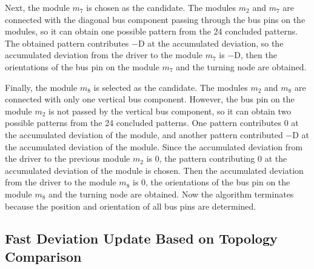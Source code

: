 Next, the module $m_7$ is chosen as the candidate. The modules $m_2$ and $m_7$
are connected with the diagonal bus component passing through the bus pins on
the modules, so it can obtain one possible pattern from the
24 concluded patterns. The obtained pattern contributes $-$D at the
accumulated deviation, so the accumulated deviation from the
driver to the module $m_7$ is $-$D, then the orientations of the bus
pin on the module $m_7$ and the turning node are obtained.

Finally, the module $m_8$ is selected as the candidate. The modules $m_2$
and $m_8$ are connected with only one vertical bus component. However, the
bus pin on the module $m_2$ is not passed by the
vertical bus component, so it can obtain two possible patterns from the
24 concluded patterns. One pattern contributes 0 at the
accumulated deviation of the module, and another pattern contributed $-$D at the
accumulated deviation of the module. Since the accumulated deviation from the
driver to the previous module $m_2$ is 0, the pattern contributing
0 at the accumulated deviation of the module is chosen. Then the accumulated
deviation from the driver to the module $m_8$ is 0, the orientations of
the bus pin on the module $m_8$ and the turning
node are obtained.
Now the algorithm terminates because the
position and orientation of all bus pins are determined.

\subsection{Fast Deviation Update Based on Topology Comparison}
\label{sec::Fast Deviation Update Based on Topology Comparison}

